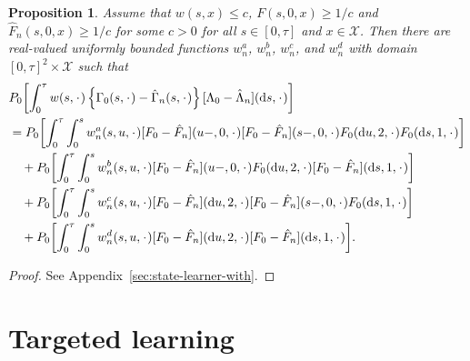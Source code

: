 \documentclass{statsoc}
\newtheorem{proposition}{Proposition}
\newcommand{\blank}{\makebox[1ex]{\textbf{$\cdot$}}}
\newcommand*\diff{\mathop{}\!\mathrm{d}}
\newcommand{\1}{\mathds{1}}
\begin{document}
\begin{proposition}
  \label{prop:dr-structure}
  Assume that \( w(s,x)\leq c \), \( F(s, 0, x) \geq 1/c \) and
  \( \hat{F}_n(s, 0, x) \geq 1/c \) for some \( c>0 \) for all
  \( s \in [0, \tau] \) and \( x \in \mathcal{X} \). Then there are real-valued
  uniformly bounded functions \( w^a_n \), \( w^b_n \), \( w^c_n \), and
  \( w^d_n \) with domain \( [0,\tau]^2 \times \mathcal{X} \) such that
  \begin{align*}
    & P_0{\left[
      \int_0^{\tau} w(s, \blank)
      \left\{
      \Gamma_0(s,\blank) -\hat{\Gamma}_n(s,\blank)
      \right\}
      [\Lambda_0-\hat{\Lambda}_n]
      (\diff s, \blank)
      \right]}
    \\
    & =
      P_0{\left[
      \int_0^{\tau} \int_0^{s} w^a_n(s,u,\blank) [F_0 - \hat{F}_n](u-, 0, \blank)[F_0 - \hat{F}_n](s-, 0, \blank) F_0(\diff u, 2, \blank ) F_0 ( \diff s, 1, \blank)
      \right]}
    \\
    & \quad +
      P_0{\left[
      \int_0^{\tau} \int_0^{s} w^b_n(s,u,\blank) [F_0 - \hat{F}_n](u-, 0, \blank)
      F_0(\diff u, 2, \blank ) [F_0 - \hat{F}_n](\diff s, 1, \blank)
      \right]}
    \\
    & \quad +
      P_0{\left[
      \int_0^{\tau} \int_0^{s} w^c_n(s,u,\blank) [F_0 - \hat{F}_n](\diff u, 2, \blank)
      [F_0 - \hat{F}_n](s-, 0, \blank)
      F_0(\diff s, 1, \blank ) 
      \right]}
    \\
    & \quad +
      P_0{\left[
      \int_0^{\tau} \int_0^{s} w^d_n(s,u,\blank) [F_0 - \hat{F}_n](\diff u, 2, \blank)
      [F_0 - \hat{F}_n](\diff s, 1, \blank)
      \right]}.
  \end{align*}
\end{proposition}
\begin{proof}
  See Appendix~\ref{sec:state-learner-with}.
\end{proof}

\section{Targeted learning}
\label{sec:targeted-learning}
\end{document}
